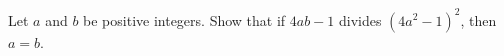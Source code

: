 Let $a$ and $b$ be positive integers. Show that if $4ab - 1$ divides $(4a^{2} - 1)^{2}$,  then $a = b$.
